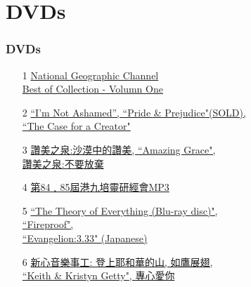 \documentclass[t]{beamer}
\newcommand{\hlink}[2]{\hyperlink{#1}{#2}}
\begin{document}
\section{DVDs}

\begin{frame}[allowframebreaks]
\frametitle{DVDs}
\begin{enumerate}
\item[1] \hlink{geography}{National Geographic Channel \\Best of Collection - Volumn One}
\item[2] \hlink{case}{``I'm Not Ashamed'', ``Pride \& Prejudice"(SOLD),\\``The Case for a Creator"}
\item[3] \hlink{praise}{讚美之泉:沙漠中的讚美, ``Amazing Grace", \\讚美之泉:不要放棄}
\item[4] \hlink{hongkong}{第84﹑85屆港九培靈研經會MP3}
\item[5] \hlink{theory}{``The Theory of Everything (Blu-ray disc)",\\``Fireproof",\\``Evangelion:3.33" (Japanese) }
\item[6] \hlink{getty}{新心音樂事工: 登上耶和華的山, 如鷹展翅,\\``Keith \& Kristyn Getty", 專心愛你}
\end{enumerate}
\end{frame}
\end{document}
